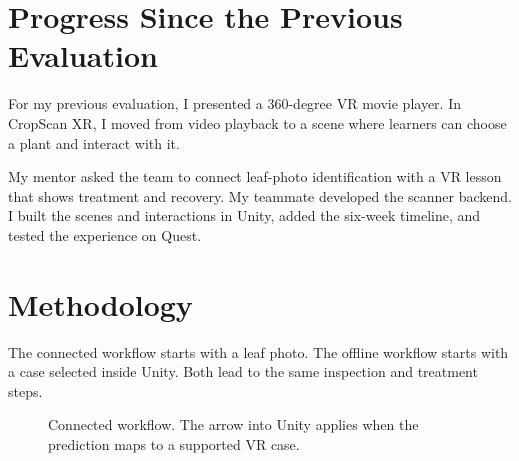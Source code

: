 \documentclass[a4paper,11pt]{article}
\begin{document}
\section{Progress Since the Previous Evaluation}
For my previous evaluation, I presented a 360-degree VR movie player. In CropScan XR, I moved from video playback to a scene where learners can choose a plant and interact with it.

My mentor asked the team to connect leaf-photo identification with a VR lesson that shows treatment and recovery. My teammate developed the scanner backend. I built the scenes and interactions in Unity, added the six-week timeline, and tested the experience on Quest.

\clearpage
\section{Methodology}
The connected workflow starts with a leaf photo. The offline workflow starts with a case selected inside Unity. Both lead to the same inspection and treatment steps.

\begin{figure}[!ht]\centering
{}
\caption{Connected workflow. The arrow into Unity applies when the prediction maps to a supported VR case.}\label{fig:workflow}
\end{figure}
\end{document}

